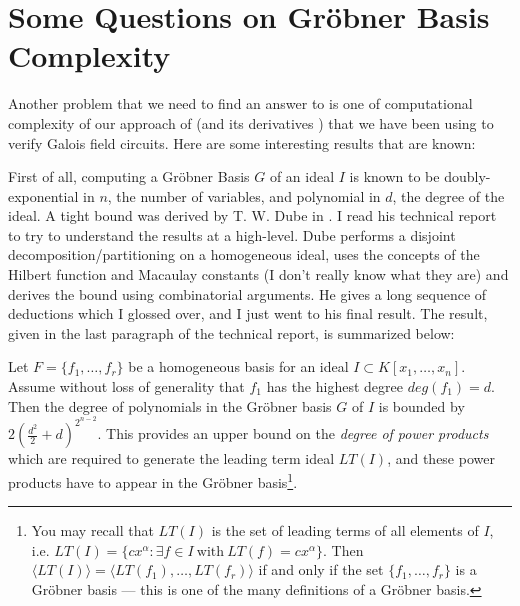\section{Some Questions on Gr\"obner Basis Complexity}

Another problem that we need to find an answer to is one of 
computational complexity of our approach of \cite{lv:tcad2013} (and
its derivatives \cite{pruss:dac14}) that we have been using to verify
Galois field circuits. Here are some interesting results that are
known:

First of all, computing a Gr\"obner Basis $G$ of an ideal $I$ is known
to be doubly-exponential in $n$, the number of variables, and
polynomial in $d$, the degree of the ideal. A tight bound was derived
by T. W. Dube in \cite{Dube:gb-complexity}. I read his technical
report to try to understand the results at a high-level. Dube performs
a disjoint decomposition/partitioning on a homogeneous ideal, uses the
concepts of the Hilbert function and Macaulay constants (I don't
really know what they are) and derives the bound using combinatorial
arguments. He gives a long sequence of deductions which I glossed
over, and I just went to his final result. The result, given in the last
paragraph of the technical report, is summarized below: 

\begin{Result}
Let $F = \{f_1, \dots, f_r\}$ be a homogeneous basis for an ideal $I
\subset K[x_1, \dots, x_n]$. Assume without loss of generality that
$f_1$ has the highest degree $deg(f_1) = d$. Then the degree of
polynomials in the Gr\"obner basis $G$ of $I$ is bounded by 
$2(\frac{d^2}{2}+d)^{2^{n-2}}$. This provides an upper bound on the
{\it degree of power products} which are required to generate the
leading term ideal $LT(I)$, and these power products have to appear in
the Gr\"obner basis\footnote{You may recall that $LT(I)$ is the set of
leading terms of all elements of $I$, i.e. $LT(I) = \{cx^{\alpha}:
\exists f \in I ~\text{with} ~ LT(f) = cx^{\alpha}\}$. Then $\langle
LT(I) \rangle = \langle LT(f_1), \dots, LT(f_r) \rangle$ if and only
if the set $\{f_1, \dots, f_r\}$ is a Gr\"obner basis --- this is one
of the many definitions of a Gr\"obner basis.}. 
\end{Result}


